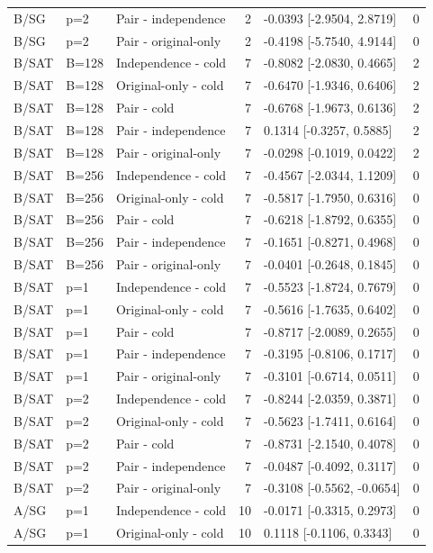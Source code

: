 \begin{longtable}{lllrlr}
B/SG & p=2 & Pair - independence & 2 & -0.0393 [-2.9504, 2.8719] & 0 \\
B/SG & p=2 & Pair - original-only & 2 & -0.4198 [-5.7540, 4.9144] & 0 \\
B/SAT & B=128 & Independence - cold & 7 & -0.8082 [-2.0830, 0.4665] & 2 \\
B/SAT & B=128 & Original-only - cold & 7 & -0.6470 [-1.9346, 0.6406] & 2 \\
B/SAT & B=128 & Pair - cold & 7 & -0.6768 [-1.9673, 0.6136] & 2 \\
B/SAT & B=128 & Pair - independence & 7 & 0.1314 [-0.3257, 0.5885] & 2 \\
B/SAT & B=128 & Pair - original-only & 7 & -0.0298 [-0.1019, 0.0422] & 2 \\
B/SAT & B=256 & Independence - cold & 7 & -0.4567 [-2.0344, 1.1209] & 0 \\
B/SAT & B=256 & Original-only - cold & 7 & -0.5817 [-1.7950, 0.6316] & 0 \\
B/SAT & B=256 & Pair - cold & 7 & -0.6218 [-1.8792, 0.6355] & 0 \\
B/SAT & B=256 & Pair - independence & 7 & -0.1651 [-0.8271, 0.4968] & 0 \\
B/SAT & B=256 & Pair - original-only & 7 & -0.0401 [-0.2648, 0.1845] & 0 \\
B/SAT & p=1 & Independence - cold & 7 & -0.5523 [-1.8724, 0.7679] & 0 \\
B/SAT & p=1 & Original-only - cold & 7 & -0.5616 [-1.7635, 0.6402] & 0 \\
B/SAT & p=1 & Pair - cold & 7 & -0.8717 [-2.0089, 0.2655] & 0 \\
B/SAT & p=1 & Pair - independence & 7 & -0.3195 [-0.8106, 0.1717] & 0 \\
B/SAT & p=1 & Pair - original-only & 7 & -0.3101 [-0.6714, 0.0511] & 0 \\
B/SAT & p=2 & Independence - cold & 7 & -0.8244 [-2.0359, 0.3871] & 0 \\
B/SAT & p=2 & Original-only - cold & 7 & -0.5623 [-1.7411, 0.6164] & 0 \\
B/SAT & p=2 & Pair - cold & 7 & -0.8731 [-2.1540, 0.4078] & 0 \\
B/SAT & p=2 & Pair - independence & 7 & -0.0487 [-0.4092, 0.3117] & 0 \\
B/SAT & p=2 & Pair - original-only & 7 & -0.3108 [-0.5562, -0.0654] & 0 \\
A/SG & p=1 & Independence - cold & 10 & -0.0171 [-0.3315, 0.2973] & 0 \\
A/SG & p=1 & Original-only - cold & 10 & 0.1118 [-0.1106, 0.3343] & 0 \\

\end{longtable}
